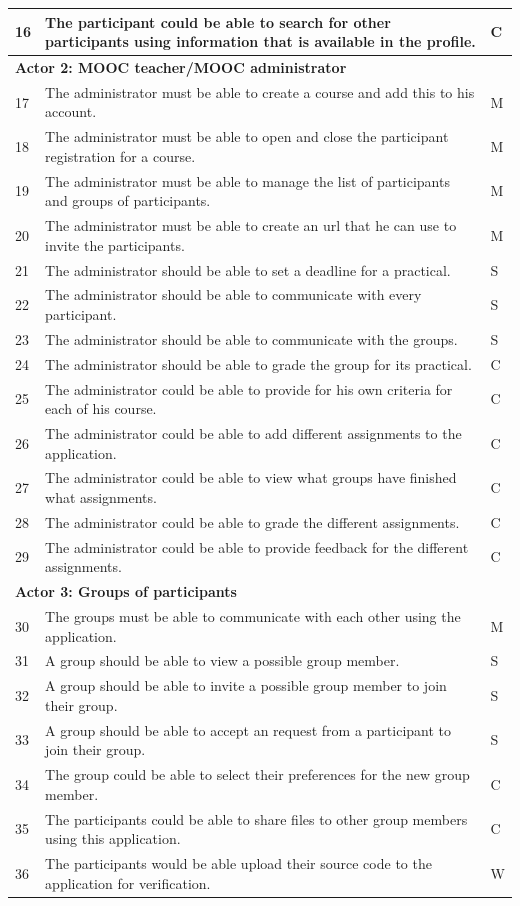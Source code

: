 \begin{tabular}{ | p{0.5cm} | p{12cm} | p{2cm} | }
16 & The participant could be able to search for other participants using information that is available in the profile. & C \\ \hline
 \multicolumn{3}{|p{14.5cm}|}{\textbf{Actor 2: MOOC teacher/MOOC administrator}} \\ \hline
17 & The administrator must be able to create a course and add this to his account. & M \\ \hline
18 & The administrator must be able to open and close the participant registration for a course. & M \\ \hline
19 & The administrator must be able to manage the list of participants and groups of participants. & M \\ \hline
20 & The administrator must be able to create an url that he can use to invite the participants. & M \\ \hline
21 & The administrator should be able to set a deadline for a practical. & S \\ \hline
22 & The administrator should be able to communicate with every participant. & S \\ \hline
23 & The administrator should be able to communicate with the groups. & S \\ \hline
24 & The administrator should be able to grade the group for its practical. & C \\ \hline
25 & The administrator could be able to provide for his own criteria for each of his course. & C \\ \hline
26 & The administrator could be able to add different assignments to the application. & C \\ \hline
27 & The administrator could be able to view what groups have finished what assignments. & C \\ \hline
28 & The administrator could be able to grade the different assignments. & C \\ \hline
29 & The administrator could be able to provide feedback for the different assignments. & C \\ \hline
\multicolumn{3}{|p{14.5cm}|}{\textbf{Actor 3: Groups of participants}} \\ \hline
30 & The groups must be able to communicate with each other using the application. & M \\ \hline
31 & A group should be able to view a possible group member. & S \\ \hline
32 & A group should be able to invite a possible group member to join their group. & S \\ \hline
33 & A group should be able to accept an request from a participant to join their group. & S \\ \hline
34 & The group could be able to select their preferences for the new group member. & C \\ \hline
35 & The participants could be able to share files to other group members using this application. & C \\ \hline
36 & The participants would be able upload their source code to the application for verification. & W \\
 \hline
\end{tabular}

